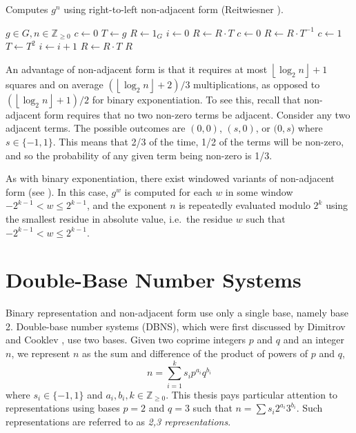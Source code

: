 \documentclass{ucalgthes1}
\theoremstyle{definition}
\newcommand{\ZZgez}{\mathbb{Z}_{\ge 0}}
\newcommand{\floor}[1]{\left\lfloor #1 \right\rfloor}
\begin{document}
\begin{algorithm}[htb]
\caption{Computes $g^n$ using right-to-left non-adjacent form (Reitwiesner \cite{reitwiesner1960}).}
\label{alg:nafR2LImmutable}
\begin{algorithmic}[1]
\Require $g \in G, n \in \ZZgez$
\State $c \gets 0$ 
\State $T \gets g$ 
\State $R \gets 1_G$
\State $i \gets 0$
	\If {$\floor{n/2^i}+c \equiv 1 \pmod 4$}
		\State $R \gets R \cdot T$
		\State $c \gets 0$
	\ElsIf {$\floor{n/2^i}+c \equiv 3 \pmod 4$}
		\State $R \gets R \cdot T^{-1}$
		\State $c \gets 1$
	\EndIf
	\State $T \gets T^2$
	\State $i \gets i+1$
\EndWhile
{} \State $R \gets R \cdot T$ \EndIf
\State \Return $R$
\end{algorithmic}
\end{algorithm}

An advantage of non-adjacent form is that it requires at most $\floor{\log_2 n}+1$ squares and on average $(\floor{\log_2 n}+2)/3$ multiplications, as opposed to $(\floor{\log_2 n}+1)/2$ for binary exponentiation.  To see this, recall that non-adjacent form requires that no two non-zero terms be adjacent.  Consider any two adjacent terms.  The possible outcomes are $(0,0)$, $(s, 0)$, or $(0, s$) where $s \in \{-1, 1\}$. This means that 2/3 of the time, 1/2 of the terms will be non-zero, and so the probability of any given term being non-zero is 1/3.

As with binary exponentiation, there exist windowed variants of non-adjacent form (see \cite[Algorithm~9.20.~p.153]{Cohen2006}).   In this case, $g^w$ is computed for each $w$ in some window $-2^{k-1} < w \le 2^{k-1}$, and the exponent $n$ is repeatedly evaluated modulo $2^k$ using the smallest residue in absolute value, i.e.\ the residue $w$ such that $-2^{k-1} < w \le 2^{k-1}$.

\section{Double-Base Number Systems}
\label{sec:dbns}

Binary representation and non-adjacent form use only a single base, namely base 2.  Double-base number systems (DBNS), which were first discussed by Dimitrov and Cooklev \cite{Dimitrov1995a, Dimitrov1995b}, use two bases.  Given two coprime integers $p$ and $q$ and an integer $n$, we represent $n$ as the sum and difference of the product of powers of $p$ and $q$,
\begin{equation}\label{eq:generalDbnsForm}
	n = \sum_{i=1}^k s_i p^{a_i} q^{b_i}
\end{equation}
where $s_i \in \{-1, 1\}$ and $a_i, b_i, k \in \ZZgez$. This thesis pays particular attention to representations using bases $p=2$ and $q=3$ such that $n = \sum s_i 2^{a_i} 3^{b_i}$.  Such representations are referred to as \emph{2,3 representations}.
\end{document}
